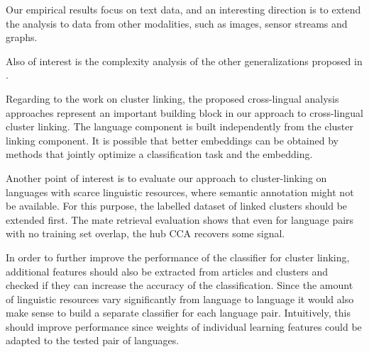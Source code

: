 Our empirical results focus on text data, and an interesting direction is to extend the analysis to
data from other modalities, such as images, sensor streams and graphs.

Also of interest is the complexity analysis of the other generalizations proposed in \cite{Kettenring}.

Regarding to the work on cluster linking, the proposed cross-lingual analysis approaches represent an important building block in our
approach to cross-lingual cluster linking. The language component is
built independently from the cluster linking component.
It is possible that better embeddings can be obtained by methods that
jointly optimize a classification task and the embedding.

Another point of interest is to evaluate our approach to cluster-linking on languages with scarce
linguistic resources, where semantic annotation might not be available. For this purpose,
the labelled dataset of linked clusters should be extended first. The mate retrieval evaluation
shows that even for language pairs with no training set overlap, the hub CCA recovers some signal.

In order to further improve the performance of the classifier for cluster linking, additional features should also
be extracted from articles and clusters and checked if they can increase the accuracy of the classification.
Since the amount of linguistic resources vary significantly from language to language it would also make sense
to build a separate classifier for each language pair. Intuitively, this should improve performance since weights
of individual learning features could be adapted to the tested pair of languages.
